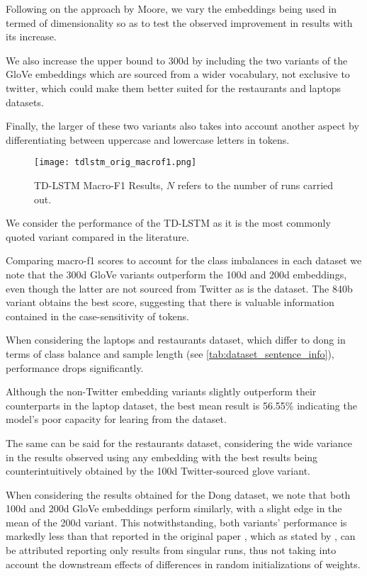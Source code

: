 \documentclass[../../fyp.tex]{subfiles}
\begin{document}
Following on the approach by Moore, we vary the embeddings being used in termed of dimensionality so as to test the observed improvement in results with its increase. 

We also increase the upper bound to 300d by including the two variants of the GloVe embeddings which are sourced from a wider vocabulary, not exclusive to twitter, which could make them better suited for the restaurants and laptops datasets. 

Finally, the larger of these two variants also takes into account another aspect by differentiating between uppercase and lowercase letters in tokens. 

\begin{figure}[!ht]
	\centering
	\texttt{[image: tdlstm\_orig\_macrof1.png]}
	\caption{TD-LSTM Macro-F1 Results, $N$ refers to the number of runs carried out.}
	\label{fig:tdlstm_orig_macrof1}
\end{figure}

We consider the performance of the TD-LSTM as it is the most commonly quoted variant compared in the literature. 

Comparing macro-f1 scores to account for the class imbalances in each dataset we note that the 300d GloVe variants outperform the 100d and 200d embeddings, even though the latter are not sourced from Twitter as is the dataset. The 840b variant obtains the best score, suggesting that there is valuable information contained in the case-sensitivity of tokens.

When considering the laptops and restaurants dataset, which differ to dong in terms of class balance and sample length (see \ref{tab:dataset_sentence_info}), performance drops significantly. 

Although the non-Twitter embedding variants slightly outperform their counterparts in the laptop dataset, the best mean result is 56.55\% indicating the model's poor capacity for learing from the dataset. 

The same can be said for the restaurants dataset, considering the wide variance in the results observed using any embedding with the best results being counterintuitively obtained by the 100d Twitter-sourced glove variant.

When considering the results obtained for the Dong dataset, we note that both 100d and 200d GloVe embeddings perform similarly, with a slight edge in the mean of the 200d variant. This notwithstanding, both variants' performance is markedly less than that reported in the original paper \cite{tang2016b}, which as stated by \citet{moore2018}, can be attributed reporting only results from singular runs, thus not taking into account the downstream effects of differences in random initializations of weights. 
\end{document}
